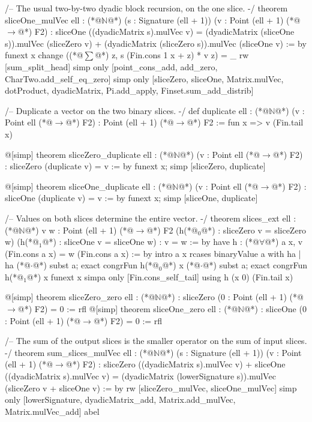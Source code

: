 /-- The usual two-by-two dyadic block recursion, on the one slice. -/
theorem sliceOne_mulVec {ell : (*@$\mathbb{N}$@*)} (s : Signature (ell + 1)) (v : Point (ell + 1) (*@$\to$@*) F2) :
    sliceOne ((dyadicMatrix s).mulVec v) =
      (dyadicMatrix (sliceOne s)).mulVec (sliceZero v) +
      (dyadicMatrix (sliceZero s)).mulVec (sliceOne v) := by
  funext x
  change ((*@$\sum$@*) z, s (Fin.cons 1 x + z) * v z) = _
  rw [sum_split_head]
  simp only [point_cons_add, add_zero, CharTwo.add_self_eq_zero]
  simp only [sliceZero, sliceOne, Matrix.mulVec, dotProduct, dyadicMatrix,
    Pi.add_apply, Finset.sum_add_distrib]

/-- Duplicate a vector on the two binary slices. -/
def duplicate {ell : (*@$\mathbb{N}$@*)} (v : Point ell (*@$\to$@*) F2) : Point (ell + 1) (*@$\to$@*) F2 :=
  fun x => v (Fin.tail x)

@[simp] theorem sliceZero_duplicate {ell : (*@$\mathbb{N}$@*)} (v : Point ell (*@$\to$@*) F2) :
    sliceZero (duplicate v) = v := by funext x; simp [sliceZero, duplicate]

@[simp] theorem sliceOne_duplicate {ell : (*@$\mathbb{N}$@*)} (v : Point ell (*@$\to$@*) F2) :
    sliceOne (duplicate v) = v := by funext x; simp [sliceOne, duplicate]

/-- Values on both slices determine the entire vector. -/
theorem slices_ext {ell : (*@$\mathbb{N}$@*)} {v w : Point (ell + 1) (*@$\to$@*) F2}
    (h(*@${}_0$@*) : sliceZero v = sliceZero w) (h(*@${}_1$@*) : sliceOne v = sliceOne w) : v = w := by
  have h : (*@$\forall$@*) a x, v (Fin.cons a x) = w (Fin.cons a x) := by
    intro a x
    rcases binaryValue a with ha | ha
    (*@$\cdot$@*) subst a; exact congrFun h(*@${}_0$@*) x
    (*@$\cdot$@*) subst a; exact congrFun h(*@${}_1$@*) x
  funext x
  simpa only [Fin.cons_self_tail] using h (x 0) (Fin.tail x)

@[simp] theorem sliceZero_zero {ell : (*@$\mathbb{N}$@*)} : sliceZero (0 : Point (ell + 1) (*@$\to$@*) F2) = 0 := rfl
@[simp] theorem sliceOne_zero {ell : (*@$\mathbb{N}$@*)} : sliceOne (0 : Point (ell + 1) (*@$\to$@*) F2) = 0 := rfl

/-- The sum of the output slices is the smaller operator on the sum of input slices. -/
theorem sum_slices_mulVec {ell : (*@$\mathbb{N}$@*)} (s : Signature (ell + 1)) (v : Point (ell + 1) (*@$\to$@*) F2) :
    sliceZero ((dyadicMatrix s).mulVec v) + sliceOne ((dyadicMatrix s).mulVec v) =
      (dyadicMatrix (lowerSignature s)).mulVec (sliceZero v + sliceOne v) := by
  rw [sliceZero_mulVec, sliceOne_mulVec]
  simp only [lowerSignature, dyadicMatrix_add, Matrix.add_mulVec, Matrix.mulVec_add]
  abel

